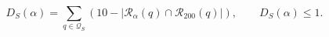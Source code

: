 \begin{equation}
 D_S(\alpha)=\sum_{q\in\mathcal Q_S}
 \left(10-|\mathcal R_\alpha(q)\cap\mathcal R_{200}(q)|\right),
 \qquad D_S(\alpha)\leq 1.
 \label{eq:7-agreement}
\end{equation}

